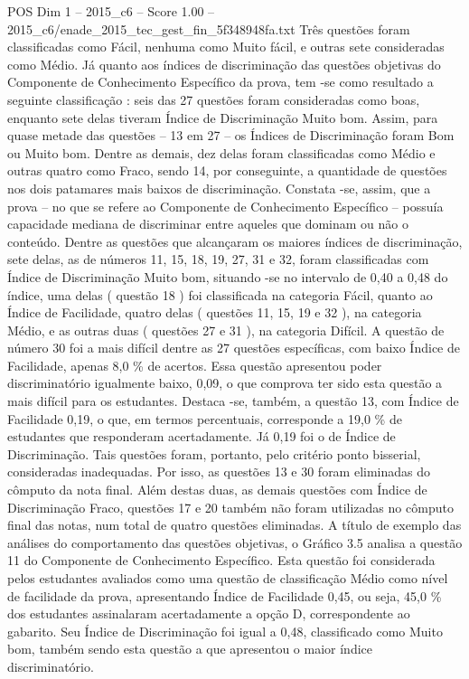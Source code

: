 \begin{textsample}{POS Dim 1 – 2015\_c6 – Score 1.00 – 2015\_c6/enade\_2015\_tec\_gest\_fin\_5f348948fa.txt}
Três questões foram classificadas como Fácil, nenhuma como Muito fácil, e outras sete consideradas como Médio.
Já quanto aos índices de discriminação das questões objetivas do Componente de Conhecimento Específico da prova, tem -se como resultado a seguinte classificação : seis das 27 questões foram consideradas como boas, enquanto sete delas tiveram Índice de Discriminação Muito bom.
Assim, para quase metade das questões – 13 em 27 – os Índices de Discriminação foram Bom ou Muito bom.
Dentre as demais, dez delas foram classificadas como Médio e outras quatro como Fraco, sendo 14, por conseguinte, a quantidade de questões nos dois patamares mais baixos de discriminação.
Constata -se, assim, que a prova – no que se refere ao Componente de Conhecimento Específico – possuía capacidade mediana de discriminar entre aqueles que dominam ou não o conteúdo.
Dentre as questões que alcançaram os maiores índices de discriminação, sete delas, as de números 11, 15, 18, 19, 27, 31 e 32, foram classificadas com Índice de Discriminação Muito bom, situando -se no intervalo de 0,40 a 0,48 do índice, uma delas ( questão 18 ) foi classificada na categoria Fácil, quanto ao Índice de Facilidade, quatro delas ( questões 11, 15, 19 e 32 ), na categoria Médio, e as outras duas ( questões 27 e 31 ), na categoria Difícil.
A questão de número 30 foi a mais difícil dentre as 27 questões específicas, com baixo Índice de Facilidade, apenas 8,0 \% de acertos.
Essa questão apresentou poder discriminatório igualmente baixo, 0,09, o que comprova ter sido esta questão a mais difícil para os estudantes.
Destaca -se, também, a questão 13, com Índice de Facilidade 0,19, o que, em termos percentuais, corresponde a 19,0 \% de estudantes que responderam acertadamente.
Já 0,19 foi o de Índice de Discriminação.
Tais questões foram, portanto, pelo critério ponto bisserial, consideradas inadequadas.
Por isso, as questões 13 e 30 foram eliminadas do cômputo da nota final.
Além destas duas, as demais questões com Índice de Discriminação Fraco, questões 17 e 20 também não foram utilizadas no cômputo final das notas, num total de quatro questões eliminadas.
A título de exemplo das análises do comportamento das questões objetivas, o Gráfico 3.5 analisa a questão 11 do Componente de Conhecimento Específico.
Esta questão foi considerada pelos estudantes avaliados como uma questão de classificação Médio como nível de facilidade da prova, apresentando Índice de Facilidade 0,45, ou seja, 45,0 \% dos estudantes assinalaram acertadamente a opção D, correspondente ao gabarito.
Seu Índice de Discriminação foi igual a 0,48, classificado como Muito bom, também sendo esta questão a que apresentou o maior índice discriminatório.

\end{textsample}
